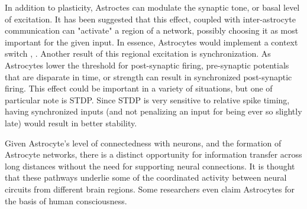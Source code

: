     In addition to plasticity, Astroctes can modulate the synaptic tone, or
    basal level of excitation. It has been suggested that this effect, coupled
    with inter-astrocyte communication can "activate" a region of a network,
    possibly choosing it as most important for the given input. In essence,
    Astrocytes would implement a context switch \cite{min_2012},
    \cite{gordleeva_2021}. Another result of this regional excitation is
    synchronization. As Astrocytes lower the threshold for post-synaptic firing,
    pre-synaptic potentials that are disparate in time, or strength can result
    in synchronized post-synaptic firing. This effect could be important in a
    variety of situations, but one of particular note is STDP. Since STDP is
    very sensitive to relative spike timing, having synchronized inputs (and not
    penalizing an input for being ever so slightly late) would result in better
    stability.

    Given Astrocyte's level of connectedness with neurons, and the formation of
    Astrocyte networks, there is a distinct opportunity for information transfer
    across long distances without the need for supporting neural
    connections. It is thought that these pathways underlie some of the
    coordinated activity between neural circuits from different brain
    regions. Some researchers even claim Astrocytes for the basis of human
    consciousness.
